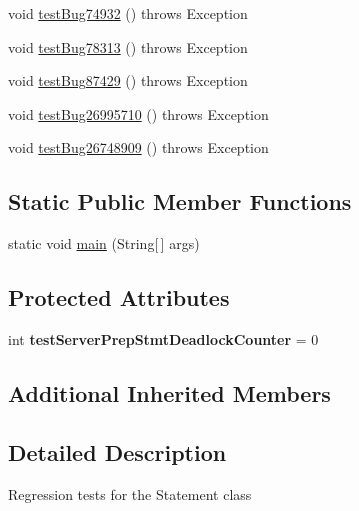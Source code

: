 \begin{DoxyCompactItemize}
\item 
void \mbox{\hyperlink{classtestsuite_1_1regression_1_1_statement_regression_test_a08b73e136a8dc102c6b24d67e1eb88ea}{test\+Bug74932}} ()  throws Exception 
\item 
void \mbox{\hyperlink{classtestsuite_1_1regression_1_1_statement_regression_test_adfebb14cf4625719dc11d7397ae26d6f}{test\+Bug78313}} ()  throws Exception 
\item 
void \mbox{\hyperlink{classtestsuite_1_1regression_1_1_statement_regression_test_aa6905a68082eddc9934046c2d8c15bae}{test\+Bug87429}} ()  throws Exception 
\item 
void \mbox{\hyperlink{classtestsuite_1_1regression_1_1_statement_regression_test_aed1e01598c9eb8bf849b56e0646f302c}{test\+Bug26995710}} ()  throws Exception 
\item 
void \mbox{\hyperlink{classtestsuite_1_1regression_1_1_statement_regression_test_a5008a06c6bd62560f9ffcbbc16be7495}{test\+Bug26748909}} ()  throws Exception 
\end{DoxyCompactItemize}
\subsection*{Static Public Member Functions}
\begin{DoxyCompactItemize}
\item 
static void \mbox{\hyperlink{classtestsuite_1_1regression_1_1_statement_regression_test_a47cd85214f68ea331f0b16fcc90771a9}{main}} (String\mbox{[}$\,$\mbox{]} args)
\end{DoxyCompactItemize}
\subsection*{Protected Attributes}
\begin{DoxyCompactItemize}
\item 
\mbox{\label{classtestsuite_1_1regression_1_1_statement_regression_test_abc0a2681fb2194305be7870e5e1dc1eb}} 
int {\bfseries test\+Server\+Prep\+Stmt\+Deadlock\+Counter} = 0
\end{DoxyCompactItemize}
\subsection*{Additional Inherited Members}


\subsection{Detailed Description}
Regression tests for the Statement class 

